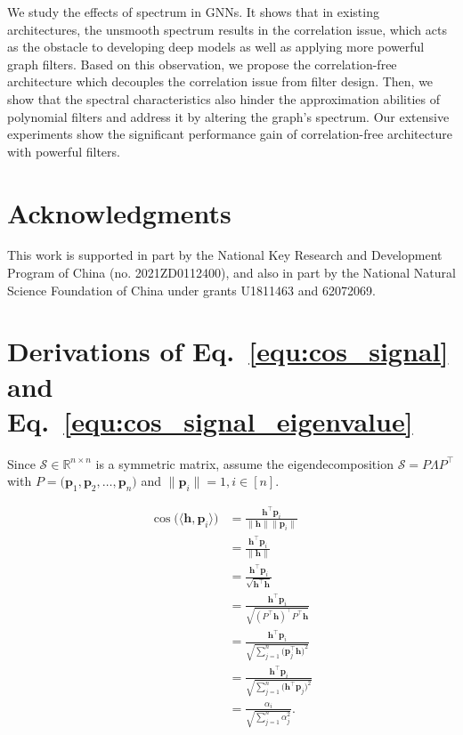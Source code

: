 \documentclass[nohyperref]{article}
\theoremstyle{plain}
\theoremstyle{definition}
\theoremstyle{remark}
\begin{document}
We study the effects of spectrum in GNNs. It shows that in existing architectures, the unsmooth spectrum results in the correlation issue, which acts as the obstacle to developing deep models as well as applying more powerful graph filters. Based on this observation, we propose the correlation-free architecture which decouples the correlation issue from filter design. Then, we show that the spectral characteristics also hinder the approximation abilities of polynomial filters and address it by altering the graph's spectrum.
Our extensive experiments show the significant performance gain of correlation-free architecture with powerful filters.

\section*{Acknowledgments}

This work is supported in part by the National Key Research and Development Program of China (no. 2021ZD0112400), and also in part by the National Natural Science Foundation of China under grants U1811463 and 62072069.


\nocite{langley00}






\newpage
\appendix
\onecolumn



\section{Derivations of Eq.~\ref{equ:cos_signal} and Eq.~\ref{equ:cos_signal_eigenvalue}}
\label{deriv:equ:cos_signal_eigenvalue}

Since $\mathcal S\in\mathbb R^{n\times n}$ is a symmetric matrix, assume the eigendecomposition $\mathcal S=P\Lambda P^{\top}$ with $P=\bigl(\bm p_1, \bm p_2, \dots, \bm p_n\bigr)$ and $\|\bm p_i\|=1, i\in [n]$.

\begin{equation}
	\nonumber
	\begin{aligned}
		\cos\bigl(\langle \bm h, \bm p_i\rangle\bigr)
		&=\frac{\bm h^{\top} \bm p_i}{\|\bm h\|\|\bm p_i\|}\\
		&=\frac{\bm h^{\top} \bm p_i}{\|\bm h\|}\\
		&=\frac{\bm h^{\top} \bm p_i}{\sqrt{\bm h^{\top} \bm h}}\\
		&=\frac{\bm h^{\top} \bm p_i}{\sqrt{(P^{\top}\bm h)^{\top} P^{\top}\bm h}}\\
		&=\frac{\bm h^{\top}\bm p_i}
		{\sqrt{\sum^n_{j=1}\bigl(\bm p_j^{\top}\bm h\bigr)^2}}\\
		&=\frac{\bm h^{\top}\bm p_i}
		{\sqrt{\sum^n_{j=1}\bigl(\bm h^{\top}\bm p_j\bigr)^2}}\\
		&=\frac{\alpha_i}{\sqrt{\sum^n_{j=1}\alpha_j^2}}.
	\end{aligned}
\end{equation}
\end{document}
